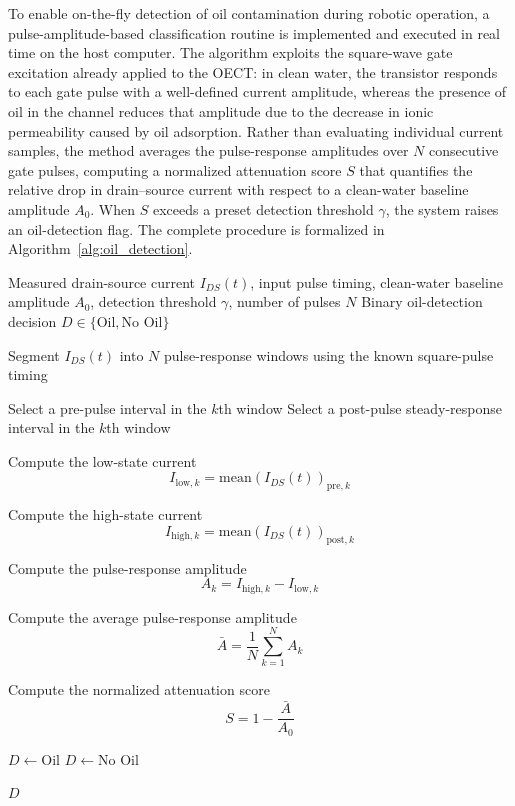 \documentclass{iopjournal}
\begin{document}
To enable on-the-fly detection of oil contamination during robotic operation, a pulse-amplitude-based classification routine is implemented and executed in real time on the host computer. The algorithm exploits the square-wave gate excitation already applied to the OECT: in clean water, the transistor responds to each gate pulse with a well-defined current amplitude, whereas the presence of oil in the channel reduces that amplitude due to the decrease in ionic permeability caused by oil adsorption. Rather than evaluating individual current samples, the method averages the pulse-response amplitudes over $N$ consecutive gate pulses, computing a normalized attenuation score $S$ that quantifies the relative drop in drain–source current with respect to a clean-water baseline amplitude $A_0$. When $S$ exceeds a preset detection threshold $\gamma$, the system raises an oil-detection flag. The complete procedure is formalized in Algorithm~\ref{alg:oil_detection}.

\begin{algorithm}[t]
\caption{Pulse-amplitude-based oil detection from OECT drain-source current}
\label{alg:oil_detection}
\begin{algorithmic}[1]
\Require Measured drain-source current $I_{DS}(t)$, input pulse timing, clean-water baseline amplitude $A_0$, detection threshold $\gamma$, number of pulses $N$
\Ensure Binary oil-detection decision $D \in \{\text{Oil}, \text{No Oil}\}$

\State Segment $I_{DS}(t)$ into $N$ pulse-response windows using the known square-pulse timing

    \State Select a pre-pulse interval in the $k$th window
    \State Select a post-pulse steady-response interval in the $k$th window

    \State Compute the low-state current
    \Statex
    \[
        I_{\mathrm{low},k}
        =
        \mathrm{mean}\!\left(I_{DS}(t)\right)_{\mathrm{pre},k}
    \]

    \State Compute the high-state current
    \Statex
    \[
        I_{\mathrm{high},k}
        =
        \mathrm{mean}\!\left(I_{DS}(t)\right)_{\mathrm{post},k}
    \]

    \State Compute the pulse-response amplitude
    \Statex
    \[
        A_k = I_{\mathrm{high},k} - I_{\mathrm{low},k}
    \]
\EndFor

\State Compute the average pulse-response amplitude
\Statex
\[
    \bar{A} = \frac{1}{N}\sum_{k=1}^{N} A_k
\]

\State Compute the normalized attenuation score
\Statex
\[
    S = 1 - \frac{\bar{A}}{A_0}
\]

    \State $D \gets \text{Oil}$
\Else
    \State $D \gets \text{No Oil}$
\EndIf

\State \Return $D$
\end{algorithmic}
\end{algorithm}
\end{document}
